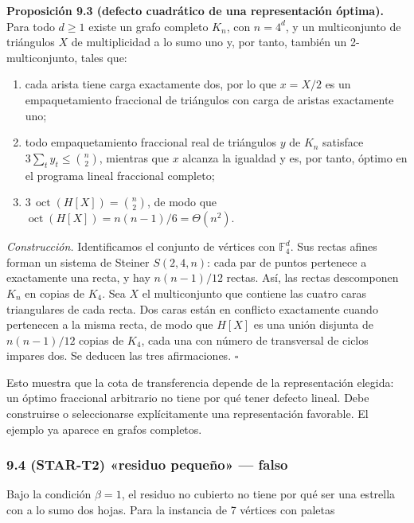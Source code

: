 \documentclass[spanish,11pt,a4paper]{article}
\providecommand{\tightlist}{\setlength{\itemsep}{0pt}\setlength{\parskip}{0pt}}
\begin{document}
\textbf{Proposición 9.3 (defecto cuadrático de una representación
óptima).} Para todo \(d\ge1\) existe un grafo completo \(K_n\), con
\(n=4^d\), y un multiconjunto de triángulos \(X\) de multiplicidad a lo
sumo uno y, por tanto, también un 2-multiconjunto, tales que:

\begin{enumerate}
\def\labelenumi{\arabic{enumi}.}
\tightlist
\item
  cada arista tiene carga exactamente dos, por lo que \(x=X/2\) es un
  empaquetamiento fraccional de triángulos con carga de aristas
  exactamente uno;
\item
  todo empaquetamiento fraccional real de triángulos \(y\) de \(K_n\)
  satisface \(3\sum_t y_t\le\binom n2\), mientras que \(x\) alcanza la
  igualdad y es, por tanto, óptimo en el programa lineal fraccional
  completo;
\item
  \(3\,\operatorname{oct}(H[X])=\binom n2\), de modo que
  \(\operatorname{oct}(H[X])=n(n-1)/6=\Theta(n^2)\).
\end{enumerate}

\emph{Construcción.} Identificamos el conjunto de vértices con
\(\mathbb F_4^d\). Sus rectas afines forman un sistema de Steiner
\(S(2,4,n)\): cada par de puntos pertenece a exactamente una recta, y
hay \(n(n-1)/12\) rectas. Así, las rectas descomponen \(K_n\) en copias
de \(K_4\). Sea \(X\) el multiconjunto que contiene las cuatro caras
triangulares de cada recta. Dos caras están en conflicto exactamente
cuando pertenecen a la misma recta, de modo que \(H[X]\) es una unión
disjunta de \(n(n-1)/12\) copias de \(K_4\), cada una con número de
transversal de ciclos impares dos. Se deducen las tres afirmaciones.
\(\square\)

Esto muestra que la cota de transferencia depende de la representación
elegida: un óptimo fraccional arbitrario no tiene por qué tener defecto
lineal. Debe construirse o seleccionarse explícitamente una
representación favorable. El ejemplo ya aparece en grafos completos.

\subsubsection{9.4 (STAR-T2) «residuo pequeño» ---
falso}\label{star-t2-residuo-pequeuxf1o-falso}

Bajo la condición \(\beta=1\), el residuo no cubierto no tiene por qué
ser una estrella con a lo sumo dos hojas. Para la instancia de 7
vértices con paletas
\end{document}
